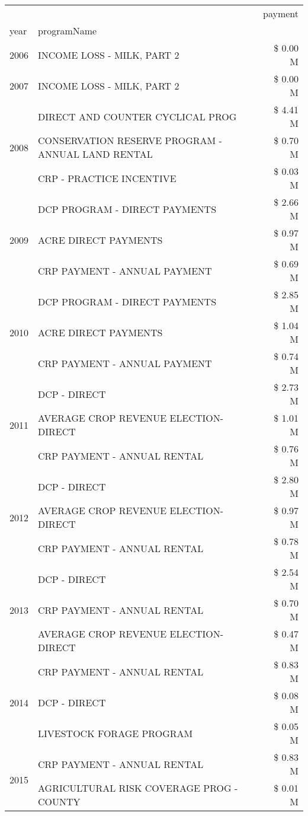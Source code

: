 \begin{tabular}{llr}
\toprule
 &  & payment \\
year & programName &  \\
\midrule
2006 & INCOME LOSS - MILK, PART 2 & \$ 0.00 M \\
\cline{1-3}
2007 & INCOME LOSS - MILK, PART 2 & \$ 0.00 M \\
\cline{1-3}
\multirow[t]{3}{*}{2008} & DIRECT AND COUNTER CYCLICAL PROG & \$ 4.41 M \\
 & CONSERVATION RESERVE PROGRAM - ANNUAL LAND RENTAL & \$ 0.70 M \\
 & CRP - PRACTICE INCENTIVE & \$ 0.03 M \\
\cline{1-3}
\multirow[t]{3}{*}{2009} & DCP PROGRAM - DIRECT PAYMENTS & \$ 2.66 M \\
 & ACRE DIRECT PAYMENTS & \$ 0.97 M \\
 & CRP PAYMENT - ANNUAL PAYMENT & \$ 0.69 M \\
\cline{1-3}
\multirow[t]{3}{*}{2010} & DCP PROGRAM - DIRECT PAYMENTS & \$ 2.85 M \\
 & ACRE DIRECT PAYMENTS & \$ 1.04 M \\
 & CRP PAYMENT - ANNUAL PAYMENT & \$ 0.74 M \\
\cline{1-3}
\multirow[t]{3}{*}{2011} & DCP - DIRECT & \$ 2.73 M \\
 & AVERAGE CROP REVENUE ELECTION-DIRECT & \$ 1.01 M \\
 & CRP PAYMENT - ANNUAL RENTAL & \$ 0.76 M \\
\cline{1-3}
\multirow[t]{3}{*}{2012} & DCP - DIRECT & \$ 2.80 M \\
 & AVERAGE CROP REVENUE ELECTION-DIRECT & \$ 0.97 M \\
 & CRP PAYMENT - ANNUAL RENTAL & \$ 0.78 M \\
\cline{1-3}
\multirow[t]{3}{*}{2013} & DCP - DIRECT & \$ 2.54 M \\
 & CRP PAYMENT - ANNUAL RENTAL & \$ 0.70 M \\
 & AVERAGE CROP REVENUE ELECTION-DIRECT & \$ 0.47 M \\
\cline{1-3}
\multirow[t]{3}{*}{2014} & CRP PAYMENT - ANNUAL RENTAL & \$ 0.83 M \\
 & DCP - DIRECT & \$ 0.08 M \\
 & LIVESTOCK FORAGE PROGRAM & \$ 0.05 M \\
\cline{1-3}
\multirow[t]{3}{*}{2015} & CRP PAYMENT - ANNUAL RENTAL & \$ 0.83 M \\
 & AGRICULTURAL RISK COVERAGE PROG - COUNTY & \$ 0.01 M \\

\end{tabular}

